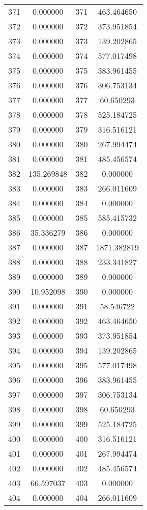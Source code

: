 \documentclass[12pt]{article}
\begin{document}
\begin{longtable}{@{}cccc@{}}
371 & 0.000000 & 371 & 463.464650 \\
372 & 0.000000 & 372 & 373.951854 \\
373 & 0.000000 & 373 & 139.202865 \\
374 & 0.000000 & 374 & 577.017498 \\
375 & 0.000000 & 375 & 383.961455 \\
376 & 0.000000 & 376 & 306.753134 \\
377 & 0.000000 & 377 & 60.650293 \\
378 & 0.000000 & 378 & 525.184725 \\
379 & 0.000000 & 379 & 316.516121 \\
380 & 0.000000 & 380 & 267.994474 \\
381 & 0.000000 & 381 & 485.456574 \\
382 & 135.269848 & 382 & 0.000000 \\
383 & 0.000000 & 383 & 266.011609 \\
384 & 0.000000 & 384 & 0.000000 \\
385 & 0.000000 & 385 & 585.415732 \\
386 & 35.336279 & 386 & 0.000000 \\
387 & 0.000000 & 387 & 1871.382819 \\
388 & 0.000000 & 388 & 233.341827 \\
389 & 0.000000 & 389 & 0.000000 \\
390 & 10.952098 & 390 & 0.000000 \\
391 & 0.000000 & 391 & 58.546722 \\
392 & 0.000000 & 392 & 463.464650 \\
393 & 0.000000 & 393 & 373.951854 \\
394 & 0.000000 & 394 & 139.202865 \\
395 & 0.000000 & 395 & 577.017498 \\
396 & 0.000000 & 396 & 383.961455 \\
397 & 0.000000 & 397 & 306.753134 \\
398 & 0.000000 & 398 & 60.650293 \\
399 & 0.000000 & 399 & 525.184725 \\
400 & 0.000000 & 400 & 316.516121 \\
401 & 0.000000 & 401 & 267.994474 \\
402 & 0.000000 & 402 & 485.456574 \\
403 & 66.597037 & 403 & 0.000000 \\
404 & 0.000000 & 404 & 266.011609 \\

\end{longtable}
\end{document}
